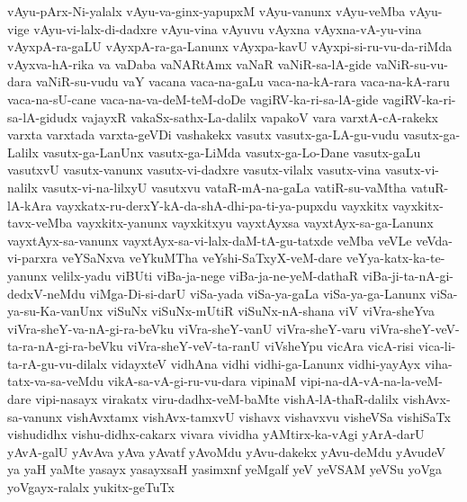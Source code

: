 {vAyu-pArx-Ni-yalalx
vAyu-va-ginx-yapupxM
vAyu-vanunx
vAyu-veMba
vAyu-vige
vAyu-vi-lalx-di-dadxre
vAyu-vina
vAyuvu
vAyxna
vAyxna-vA-yu-vina
vAyxpA-ra-gaLU
vAyxpA-ra-ga-Lanunx
vAyxpa-kavU
vAyxpi-si-ru-vu-da-riMda
vAyxva-hA-rika
va
vaDaba
vaNARtAmx
vaNaR
vaNiR-sa-lA-gide
vaNiR-su-vu-dara
vaNiR-su-vudu
vaY
vacana
vaca-na-gaLu
vaca-na-kA-rara
vaca-na-kA-raru
vaca-na-sU-cane
vaca-na-va-deM-teM-doDe
vagiRV-ka-ri-sa-lA-gide
vagiRV-ka-ri-sa-lA-gidudx
vajayxR
vakaSx-sathx-La-dalilx
vapakoV
vara
varxtA-cA-rakekx
varxta
varxtada
varxta-geVDi
vashakekx
vasutx
vasutx-ga-LA-gu-vudu
vasutx-ga-Lalilx
vasutx-ga-LanUnx
vasutx-ga-LiMda
vasutx-ga-Lo-Dane
vasutx-gaLu
vasutxvU
vasutx-vanunx
vasutx-vi-dadxre
vasutx-vilalx
vasutx-vina
vasutx-vi-nalilx
vasutx-vi-na-lilxyU
vasutxvu
vataR-mA-na-gaLa
vatiR-su-vaMtha
vatuR-lA-kAra
vayxkatx-ru-derxY-kA-da-shA-dhi-pa-ti-ya-pupxdu
vayxkitx
vayxkitx-tavx-veMba
vayxkitx-yanunx
vayxkitxyu
vayxtAyxsa
vayxtAyx-sa-ga-Lanunx
vayxtAyx-sa-vanunx
vayxtAyx-sa-vi-lalx-daM-tA-gu-tatxde
veMba
veVLe
veVda-vi-parxra
veYSaNxva
veYkuMTha
veYshi-SaTxyX-veM-dare
veYya-katx-ka-te-yanunx
velilx-yadu
viBUti
viBa-ja-nege
viBa-ja-ne-yeM-dathaR
viBa-ji-ta-nA-gi-dedxV-neMdu
viMga-Di-si-darU
viSa-yada
viSa-ya-gaLa
viSa-ya-ga-Lanunx
viSa-ya-su-Ka-vanUnx
viSuNx
viSuNx-mUtiR
viSuNx-nA-shana
viV
viVra-sheYva
viVra-sheY-va-nA-gi-ra-beVku
viVra-sheY-vanU
viVra-sheY-varu
viVra-sheY-veV-ta-ra-nA-gi-ra-beVku
viVra-sheY-veV-ta-ranU
viVsheYpu
vicAra
vicA-risi
vica-li-ta-rA-gu-vu-dilalx
vidayxteV
vidhAna
vidhi
vidhi-ga-Lanunx
vidhi-yayAyx
viha-tatx-va-sa-veMdu
vikA-sa-vA-gi-ru-vu-dara
vipinaM
vipi-na-dA-vA-na-la-veM-dare
vipi-nasayx
virakatx
viru-dadhx-veM-baMte
vishA-lA-thaR-dalilx
vishAvx-sa-vanunx
vishAvxtamx
vishAvx-tamxvU
vishavx
vishavxvu
visheVSa
vishiSaTx
vishudidhx
vishu-didhx-cakarx
vivara
vividha
yAMtirx-ka-vAgi
yArA-darU
yAvA-galU
yAvAva
yAva
yAvatf
yAvoMdu
yAvu-dakekx
yAvu-deMdu
yAvudeV
ya
yaH
yaMte
yasayx
yasayxsaH
yasimxnf
yeMgalf
yeV
yeVSAM
yeVSu
yoVga
yoVgayx-ralalx
yukitx-geTuTx
}

